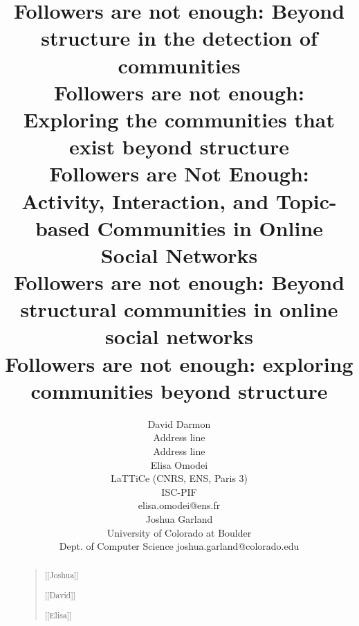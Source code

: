 \documentclass[letterpaper]{article}
\begin{document}
\title{Followers are not enough: Beyond structure in the detection of communities \\
Followers are not enough: Exploring the communities that exist beyond structure \\
Followers are Not Enough: Activity, Interaction, and Topic-based Communities in Online Social Networks \\
Followers are not enough: Beyond structural communities in online social networks
 \\
 Followers are not enough: exploring communities beyond structure
\\
 }
  \author{David Darmon \\
 Address line\\
 Address line\\
 \And Elisa Omodei \\
 LaTTiCe (CNRS, ENS, Paris 3)\\
ISC-PIF\\
elisa.omodei@ens.fr \\
 \And 
 Joshua Garland\\
 University of Colorado at Boulder\\
Dept. of Computer Science
joshua.garland@colorado.edu}

\maketitle

\begin{abstract}
\begin{quote}
[[Joshua]]

[[David]]

[[Elisa]]

\end{quote}
\end{abstract}









\end{document}
